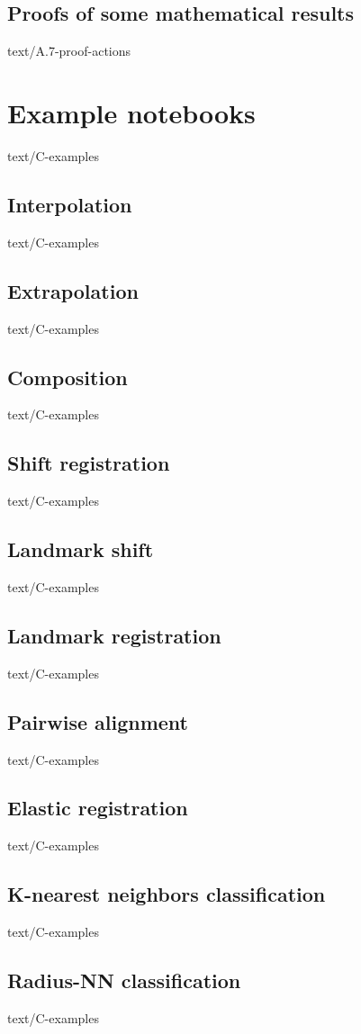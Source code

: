\documentclass[epsbased,copyleft,final,loe, lof,extendedindex,firstnumbered,tfg,covers,english]{tfgtfmthesisuam}
\begin{document}
  \section{Proofs of some mathematical results\label{SEC:ACTION}}{text/A.7-proof-actions}


\chapter{Example notebooks\label{CAP:EXAMPLES}}{text/C-examples}
	\section{Interpolation\label{EX:INTERPOLATION}}{text/C-examples}
	\section{Extrapolation\label{EX:EXTRAPOLATION}}{text/C-examples}
	\section{Composition\label{EX:COMPOSITION}}{text/C-examples}
	\section{Shift registration\label{EX:SHIFT}}{text/C-examples}
	\section{Landmark shift\label{EX:LANDSHIFT}}{text/C-examples}
	\section{Landmark registration\label{EX:LANDMARKREG}}{text/C-examples}
	\section{Pairwise alignment\label{EX:PAIRWISE}}{text/C-examples}
	\section{Elastic registration\label{EX:ELASTIC}}{text/C-examples}
	\section{K-nearest neighbors classification\label{EX:KNN}}{text/C-examples}
	\section{Radius-NN classification\label{EX:RNN}}{text/C-examples}
\end{document}
